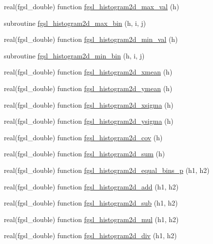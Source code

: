 \begin{DoxyCompactItemize}
\item 
real(fgsl\-\_\-double) function \hyperlink{histogram_8finc_a19b8d36f12520581d0ba6d595068ed68}{fgsl\-\_\-histogram2d\-\_\-max\-\_\-val} (h)
\item 
subroutine \hyperlink{histogram_8finc_ab1b0844796b5273d68d1d5016712ed22}{fgsl\-\_\-histogram2d\-\_\-max\-\_\-bin} (h, i, j)
\item 
real(fgsl\-\_\-double) function \hyperlink{histogram_8finc_a1ace6d2b9e54162300db8c0f6fc71a92}{fgsl\-\_\-histogram2d\-\_\-min\-\_\-val} (h)
\item 
subroutine \hyperlink{histogram_8finc_a3f4e17703f7235a66629f8c81dcd39ff}{fgsl\-\_\-histogram2d\-\_\-min\-\_\-bin} (h, i, j)
\item 
real(fgsl\-\_\-double) function \hyperlink{histogram_8finc_abc89a40b479ad73436db4b6ee9559b93}{fgsl\-\_\-histogram2d\-\_\-xmean} (h)
\item 
real(fgsl\-\_\-double) function \hyperlink{histogram_8finc_ad8cb782bcdc1619bf271be2898b9ea3a}{fgsl\-\_\-histogram2d\-\_\-ymean} (h)
\item 
real(fgsl\-\_\-double) function \hyperlink{histogram_8finc_a23f05f7ca11815e90e37cb7bc6da9327}{fgsl\-\_\-histogram2d\-\_\-xsigma} (h)
\item 
real(fgsl\-\_\-double) function \hyperlink{histogram_8finc_af14c3ceba9c1d8c6083c9514c74c9d4f}{fgsl\-\_\-histogram2d\-\_\-ysigma} (h)
\item 
real(fgsl\-\_\-double) function \hyperlink{histogram_8finc_a2d7d95fedb019b36a58a11f1af3aeeae}{fgsl\-\_\-histogram2d\-\_\-cov} (h)
\item 
real(fgsl\-\_\-double) function \hyperlink{histogram_8finc_a5063c665369dc777c289d8791e2ec53c}{fgsl\-\_\-histogram2d\-\_\-sum} (h)
\item 
real(fgsl\-\_\-double) function \hyperlink{histogram_8finc_aa38976b1d582468ebee62cffa5365aea}{fgsl\-\_\-histogram2d\-\_\-equal\-\_\-bins\-\_\-p} (h1, h2)
\item 
real(fgsl\-\_\-double) function \hyperlink{histogram_8finc_a48156dfaf1027f1683927780ecbc4fb0}{fgsl\-\_\-histogram2d\-\_\-add} (h1, h2)
\item 
real(fgsl\-\_\-double) function \hyperlink{histogram_8finc_aaff0707aaf0428c8ccb419c1b9703802}{fgsl\-\_\-histogram2d\-\_\-sub} (h1, h2)
\item 
real(fgsl\-\_\-double) function \hyperlink{histogram_8finc_a19b397da4b23893d47bc4d6aff3c9b82}{fgsl\-\_\-histogram2d\-\_\-mul} (h1, h2)
\item 
real(fgsl\-\_\-double) function \hyperlink{histogram_8finc_ac3fdc9fdc419170016f188fad746516c}{fgsl\-\_\-histogram2d\-\_\-div} (h1, h2)

\end{DoxyCompactItemize}
